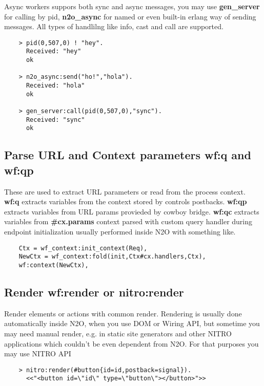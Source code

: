 Async workers suppors both sync and async messages, you may use {\bf gen\_server}
for calling by pid, {\bf n2o\_async} for named or even built-in erlang way of
sending messages. All types of handlilng like info, cast and call are supported.

\vspace{1\baselineskip}
\begin{lstlisting}
    > pid(0,507,0) ! "hey".
      Received: "hey"
      ok

    > n2o_async:send("ho!","hola").
      Received: "hola"
      ok

    > gen_server:call(pid(0,507,0),"sync").
      Received: "sync"
      ok
\end{lstlisting}
\vspace{1\baselineskip}

\subsection{Parse URL and Context parameters {\bf wf:q} and {\bf wf:qp}}
These are used to extract URL parameters or read from the process context.
{\bf wf:q} extracts variables from the context stored by controls postbacks.
{\bf wf:qp} extracts variables from URL params provieded by cowboy bridge.
{\bf wf:qc} extracts variables from {\bf \#cx.params} context parsed with
custom query handler during endpoint initialization usually performed
inside N2O with something like.

\vspace{1\baselineskip}
\begin{lstlisting}
    Ctx = wf_context:init_context(Req),
    NewCtx = wf_context:fold(init,Ctx#cx.handlers,Ctx),
    wf:context(NewCtx),
\end{lstlisting}
\vspace{1\baselineskip}

\newpage
\subsection{Render {\bf wf:render} or {\bf nitro:render}}
Render elements or actions with common render. Rendering is usually
done automatically inside N2O, when you use DOM or Wiring API, but sometime you may
need manual render, e.g. in static site generators and other NITRO applications
which couldn't be even dependent from N2O. For that purposes you may use NITRO API

\vspace{1\baselineskip}
\begin{lstlisting}
    > nitro:render(#button{id=id,postback=signal}).
      <<"<button id=\"id\" type=\"button\"></button>">>
\end{lstlisting}
\vspace{1\baselineskip}

